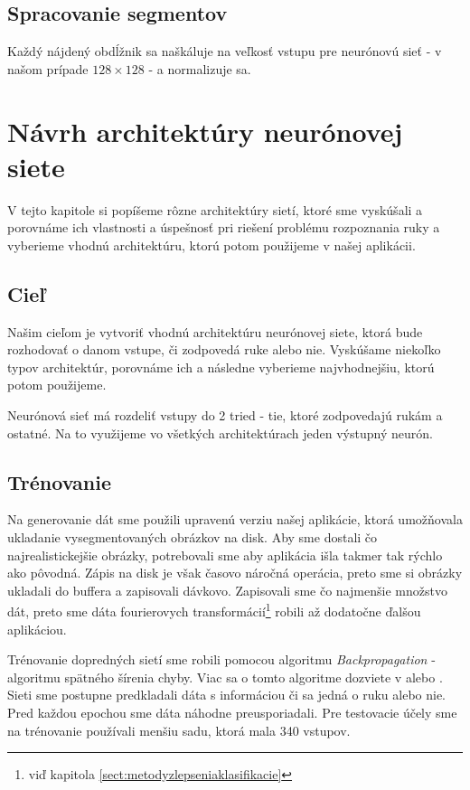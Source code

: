 \subsection{Spracovanie segmentov}
Každý nájdený obdĺžnik sa naškáluje na veľkosť vstupu pre neurónovú sieť - v našom prípade $128\times 128$ - a normalizuje sa.


\section{Návrh architektúry neurónovej siete}\label{chap:neuralnetarch}

V tejto kapitole si popíšeme rôzne architektúry sietí, ktoré sme vyskúšali a porovnáme ich vlastnosti a úspešnosť pri riešení problému rozpoznania ruky a vyberieme vhodnú architektúru, ktorú potom použijeme v našej aplikácii.

\subsection{Cieľ}

Našim cieľom je vytvoriť vhodnú architektúru neurónovej siete, ktorá bude rozhodovať o danom vstupe, či zodpovedá ruke alebo nie. Vyskúšame niekoľko typov architektúr, porovnáme ich a následne vyberieme najvhodnejšiu, ktorú potom použijeme. 

Neurónová sieť má rozdeliť vstupy do 2 tried - tie, ktoré zodpovedajú rukám a ostatné. Na to využijeme vo všetkých architektúrach jeden výstupný neurón.

\subsection{Trénovanie}

Na generovanie dát sme použili upravenú verziu našej aplikácie, ktorá umožňovala ukladanie vysegmentovaných obrázkov na disk. Aby sme dostali čo najrealistickejšie obrázky, potrebovali sme aby aplikácia išla takmer tak rýchlo ako pôvodná. Zápis na disk je však časovo náročná operácia, preto sme si obrázky ukladali do buffera a zapisovali dávkovo. Zapisovali sme čo najmenšie množstvo dát, preto sme dáta fourierovych transformácií\footnote{viď kapitola \ref{sect:metodyzlepseniaklasifikacie} } robili až dodatočne ďalšou aplikáciou.

Trénovanie dopredných sietí sme robili pomocou algoritmu \textit{Backpropagation} - algoritmu spätného šírenia chyby. Viac sa o tomto algoritme dozviete v \cite{haykin1999neural} alebo \cite{kvasnicka1997uvod}. Sieti sme postupne predkladali dáta s informáciou či sa jedná o ruku alebo nie. Pred každou epochou sme dáta náhodne preusporiadali. Pre testovacie účely sme na trénovanie používali menšiu sadu, ktorá mala 340 vstupov.

